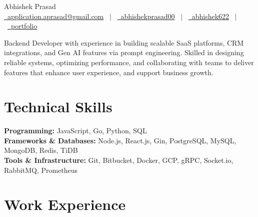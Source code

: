 \documentclass[a4paper,12pt]{article}
\begin{document}
\pagestyle{empty} 

\begin{center}
{\Huge{Abhishek Prasad}} \\[4pt]
\href{mailto:application.aprasad@gmail.com}{\raisebox{-0.05\height}\faEnvelope\ application.aprasad@gmail.com} \ $|$ \
\href{https://linkedin.com/in/abhishekprasad00}{\raisebox{-0.05\height}\faLinkedin\ abhishekprasad00} \ $|$ \
\href{https://github.com/abhishek622}{\raisebox{-0.05\height}\faGithub\ abhishek622} \ $|$ \
\href{https://portfolio.abhishekprasad0602.workers.dev}{\raisebox{-0.05\height}\faGlobe\ portfolio}
\end{center}


Backend Developer with experience in building scalable SaaS platforms, CRM integrations, and Gen AI features via prompt engineering. Skilled in designing reliable systems, optimizing performance, and collaborating with teams to deliver features that enhance user experience, and support business growth.

\section{Technical Skills}
\textbf{Programming:} JavaScript, Go, Python, SQL \\
\textbf{Frameworks \& Databases:} Node.js, React.js, Gin, PostgreSQL, MySQL, MongoDB, Redis, TiDB \\
\textbf{Tools \& Infrastructure:} Git, Bitbucket, Docker, GCP, gRPC, Socket.io, RabbitMQ, Prometheus



\section{Work Experience}
\end{document}
